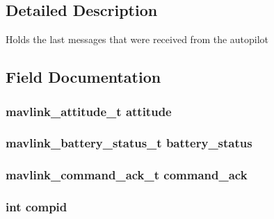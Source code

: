 \subsection{Detailed Description}
Holds the last messages that were received from the autopilot 

\subsection{Field Documentation}
\subsubsection[{\texorpdfstring{attitude}{attitude}}]{\setlength{\rightskip}{0pt plus 5cm}mavlink\+\_\+attitude\+\_\+t attitude}\hypertarget{struct_mavlink___messages_a47b4f113f51db6752e7a800d10afffa3}{}\label{struct_mavlink___messages_a47b4f113f51db6752e7a800d10afffa3}
\subsubsection[{\texorpdfstring{battery\+\_\+status}{battery_status}}]{\setlength{\rightskip}{0pt plus 5cm}mavlink\+\_\+battery\+\_\+status\+\_\+t battery\+\_\+status}\hypertarget{struct_mavlink___messages_a1d01753b58f387b8cc6d59391569dda5}{}\label{struct_mavlink___messages_a1d01753b58f387b8cc6d59391569dda5}
\subsubsection[{\texorpdfstring{command\+\_\+ack}{command_ack}}]{\setlength{\rightskip}{0pt plus 5cm}mavlink\+\_\+command\+\_\+ack\+\_\+t command\+\_\+ack}\hypertarget{struct_mavlink___messages_a3ef05502567cfd552330d9ede9a89552}{}\label{struct_mavlink___messages_a3ef05502567cfd552330d9ede9a89552}
\subsubsection[{\texorpdfstring{compid}{compid}}]{\setlength{\rightskip}{0pt plus 5cm}int compid}\hypertarget{struct_mavlink___messages_af0d634d7b4bfadf921b2e991039d38a6}{}\label{struct_mavlink___messages_af0d634d7b4bfadf921b2e991039d38a6}
